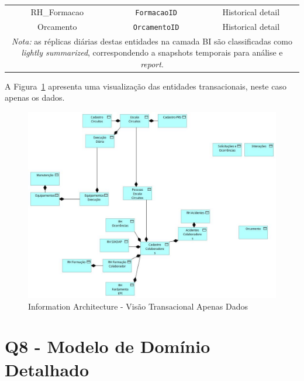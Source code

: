 \documentclass[12pt,a4paper,final]{article}
\begin{document}
\begin{table}[H]
\begin{tabular}{@{}|c|c|c|@{}}
            RH\_Formacao                   & \texttt{FormacaoID}        & Historical detail\\
            Orcamento                       & \texttt{OrcamentoID}    & Historical detail\\
            \midrule
            \multicolumn{3}{p{12cm}}{\textit{Nota:} as réplicas diárias destas entidades na
            camada BI são classificadas como \emph{lightly summarized}, correspondendo a
            snapshots temporais para análise e \textit{report}.}\\
            \bottomrule
        \end{tabular}
    \end{table}

    \newpage

    A Figura~\ref{fig:info-structure} apresenta uma visualização das entidades transacionais, neste caso apenas os
    dados.

    \begin{figure}[H]
        \centering
        \includegraphics[width=\textwidth]{Q7 Information Architecture - Transacional Apenas Dados}
        \caption{Information Architecture - Visão Transacional Apenas Dados}
        \label{fig:info-structure}
    \end{figure}

    \newpage
    \section*{Q8 - Modelo de Domínio Detalhado}
\end{document}
